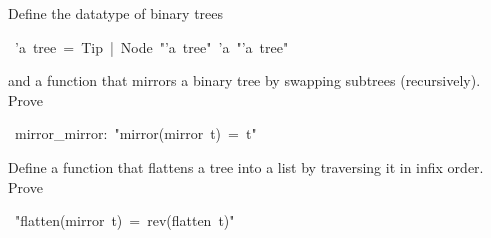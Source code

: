 \begin{isabelle}%
%
\begin{isamarkuptext}%
\noindent
Define the datatype of binary trees%
\end{isamarkuptext}%
\ 'a\ tree\ =\ Tip\ |\ Node\ {"}'a\ tree{"}\ 'a\ {"}'a\ tree{"}%
\begin{isamarkuptext}%
\noindent
and a function  that mirrors a binary tree
by swapping subtrees (recursively). Prove%
\end{isamarkuptext}%
\ mirror\_mirror:\ {"}mirror(mirror\ t)\ =\ t{"}%
\begin{isamarkuptext}%
\noindent
Define a function  that flattens a tree into a list
by traversing it in infix order. Prove%
\end{isamarkuptext}%
\ {"}flatten(mirror\ t)\ =\ rev(flatten\ t){"}\end{isabelle}%
